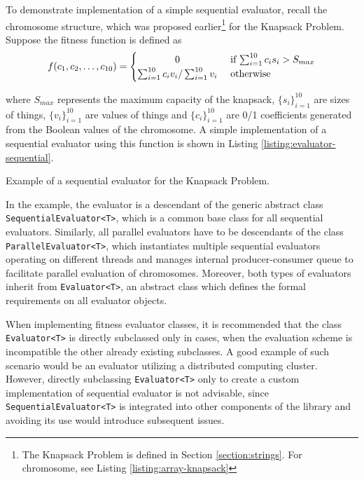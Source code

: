 To demonstrate implementation of a simple sequential evaluator, recall the chromosome structure, which was proposed earlier\footnote{The Knapsack Problem is defined in Section \ref{section:strings}. For chromosome, see Listing \ref{listing:array-knapsack}} for the Knapsack Problem. Suppose the fitness function is defined as
~
\begin{align}
	f(c_1, c_2, \dots, c_{10})
	=
	\begin{cases} 
		\hfill 0 \hfill & \text{ if $\sum_{i=1}^{10} c_i s_i>S_{max}$} \\
		\hfill \sum_{i=1}^{10} c_i v_i / \sum_{i=1}^{10} v_i \hfill & \text{ otherwise} \\
	\end{cases}
\end{align}

\noindent
where $S_{max}$ represents the maximum capacity of the knapsack, $\{s_i\}_{i=1}^{10}$ are sizes of things, $\{v_i\}_{i=1}^{10}$ are values of things and $\{c_i\}_{i=1}^{10}$ are 0/1 coefficients generated from the Boolean values of the chromosome. A simple implementation of a sequential evaluator using this function is shown in Listing \ref{listing:evaluator-sequential}.

\begin{listing}[ht]
	\caption{Example of a sequential evaluator for the Knapsack Problem.}
	\label{listing:evaluator-sequential}
\end{listing}

In the example, the evaluator is a descendant of the generic abstract class \texttt{SequentialEvaluator<T>}, which is a common base class for all sequential evaluators. Similarly, all parallel evaluators have to be descendants of the class \texttt{ParallelEvaluator<T>}, which instantiates multiple sequential evaluators operating on different threads and manages internal producer-consumer queue to facilitate parallel evaluation of chromosomes. Moreover, both types of evaluators inherit from \texttt{Evaluator<T>}, an abstract class which defines the formal requirements on all evaluator objects.

When implementing fitness evaluator classes, it is recommended that the class \texttt{Evaluator<T>} is directly subclassed only in cases, when the evaluation scheme is incompatible the other already existing subclasses. A good example of such scenario would be an evaluator utilizing a distributed computing cluster. However, directly subclassing \texttt{Evaluator<T>} only to create a custom implementation of sequential evaluator is not advisable, since \texttt{SequentialEvaluator<T>} is integrated into other components of the library and avoiding its use would introduce subsequent issues.


